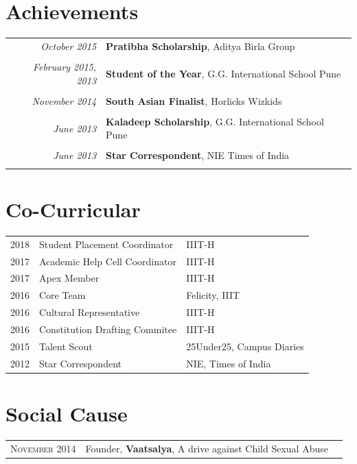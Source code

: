 \documentclass[a4paper,10pt]{article}
\begin{document}
\section{Achievements}
\begin{tabular}{r|p{11cm}}


 \emph{October 2015} & \textbf{Pratibha Scholarship}, Aditya Birla Group\\\multicolumn{2}{c}{} \\
 
  \emph{February 2015, 2013} & \textbf{Student of the Year}, G.G. International School Pune\\\multicolumn{2}{c}{} \\
 

 \emph{November 2014} & \textbf{South Asian Finalist}, Horlicks Wizkids\\\multicolumn{2}{c}{} \\
 
 \emph{June 2013} & \textbf{Kaladeep Scholarship}, G.G. International School Pune\\\multicolumn{2}{c}{} \\
 
 
 \emph{June 2013} &\textbf{ Star Correspondent}, NIE Times of India\\\multicolumn{2}{c}{} \\
 

\end{tabular}






\section{Co-Curricular}


 \begin{tabular}{rll}
2018 	&Student Placement Coordinator    &IIIT-H\\
2017 	&Academic Help Cell Coordinator    &IIIT-H\\
2017 	&Apex Member    &IIIT-H\\
2016    &Core Team  &Felicity, IIIT \\
2016    &Cultural Representative   &IIIT-H\\
2016   &Constitution Drafting Commitee  &IIIT-H\\
2015   &Talent Scout   &25Under25, Campus Diaries\\
2012   &Star Correspondent   &NIE, Times of India\\
\end{tabular}
 
\section{Social Cause}


 \begin{tabular}{rll}
 \textsc{November} 2014 & Founder, \textbf{Vaatsalya}, A drive against Child Sexual Abuse\\
\end{tabular}



\newpage
\end{document}
